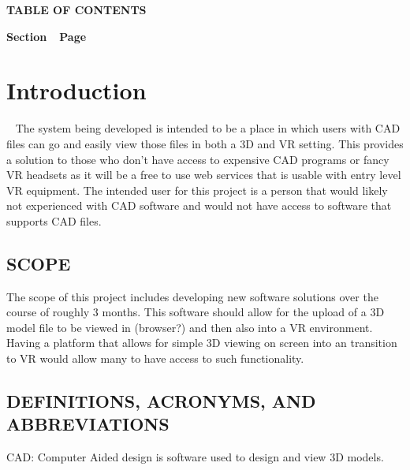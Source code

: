 \documentclass[letterpaper, 10pt, draftclsnofoot, onecolumn]{IEEEtran}
\begin{document}




{\centering{}\bfseries\color{black}
TABLE OF CONTENTS
\par}


\bigskip

{\bfseries\color{black}
Section\ \ Page}

\setcounter{tocdepth}{9}
\renewcommand\contentsname{}
\tableofcontents

\bigskip





\clearpage\clearpage\setcounter{page}{1}\pagestyle{Convertii}
\section[Introduction]{\rmfamily\bfseries\color{black}
Introduction}

\foreignlanguage{english}{\textit{}}\foreignlanguage{english}{ \ }
{\color{black}
The system being developed is intended to be a place in which users with CAD files can go and easily view those files in both a 3D and VR setting. This provides a solution to those who don't have access to expensive CAD programs or fancy VR headsets as it will be a free to use web services that is usable with entry level VR equipment. The intended user for this project is a person that would likely not experienced with CAD software and would not have access to software that supports CAD files.  }


\subsection[SCOPE]{\rmfamily\bfseries\color{black}
SCOPE}
{\color{black}
The scope of this project includes developing new software solutions over the course of roughly 3 months. This software should allow for the upload of a 3D model file to be viewed in (browser?) and then also into a VR environment. Having a platform that allows for simple 3D viewing on screen into an transition to VR would allow many to have access to such functionality. }

\subsection[DEFINITIONS, ACRONYMS, AND
ABBREVIATIONS]{\rmfamily\bfseries\color{black}
DEFINITIONS, ACRONYMS, AND ABBREVIATIONS}
{\color{black}
	CAD: Computer Aided design is software used to design and view 3D models.
}
\end{document}
